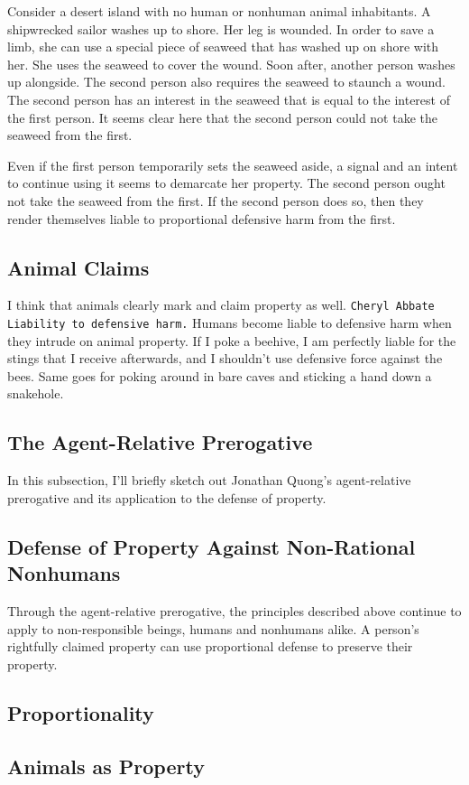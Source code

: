\documentclass[12pt]{article}
\begin{document}
	Consider a desert island with no human or nonhuman animal inhabitants.
	A shipwrecked sailor washes up to shore. Her leg is wounded. In order to
	save a limb, she can use a special piece of seaweed that has washed up on
	shore with her. She uses the seaweed to cover the wound. Soon after, another
	person washes up alongside. The second person also requires the seaweed to
	staunch a wound. The second person has an interest in the seaweed that is
	equal to the interest of the first person. It seems clear here that the
	second person could not take the seaweed from the first.

	Even if the first person temporarily sets the seaweed aside, a signal and
	an intent to continue using it seems to demarcate her property. The second
	person ought not take the seaweed from the first. If the second person does
	so, then they render themselves liable to proportional defensive harm from
	the first.

	\subsection{Animal Claims}

	I think that animals clearly mark and claim property as well.
	\texttt{Cheryl Abbate Liability to defensive harm.} Humans become liable to
	defensive harm when they intrude on animal property.  If I poke a beehive,
	I am perfectly liable for the stings that I receive afterwards, and I
	shouldn’t use defensive force against the bees.  Same goes for poking
	around in bare caves and sticking a hand down a snakehole.

	\subsection{The Agent-Relative Prerogative}

	In this subsection, I’ll briefly sketch out Jonathan Quong’s agent-relative
	prerogative and its application to the defense of property.

	\subsection{Defense of Property Against Non-Rational Nonhumans}
	
	Through the agent-relative prerogative, the principles described above
	continue to apply to non-responsible beings, humans and nonhumans alike.
	A person’s rightfully claimed property can use proportional defense to
	preserve their property. 

	\subsection{Proportionality}
	\subsection{Animals as Property}
\end{document}
